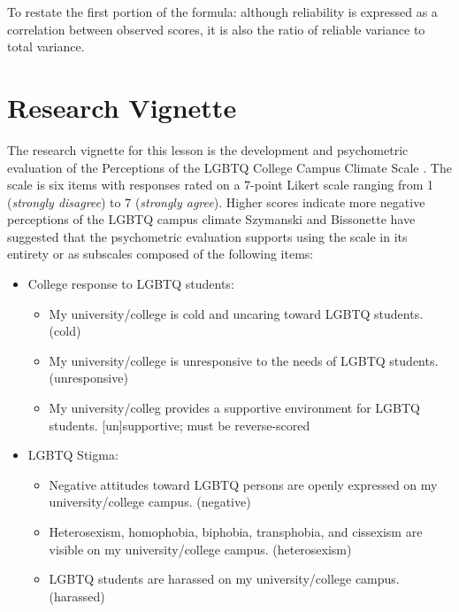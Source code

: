 \documentclass[
  english,
]{book}
\providecommand{\tightlist}{%
  \setlength{\itemsep}{0pt}\setlength{\parskip}{0pt}}
\begin{document}
To restate the first portion of the formula: although reliability is expressed as a correlation between observed scores, it is also the ratio of reliable variance to total variance.

\hypertarget{research-vignette-2}{%
\section{Research Vignette}\label{research-vignette-2}}

The research vignette for this lesson is the development and psychometric evaluation of the Perceptions of the LGBTQ College Campus Climate Scale \citeyearpar{szymanski_perceptions_2020}. The scale is six items with responses rated on a 7-point Likert scale ranging from 1 (\emph{strongly disagree}) to 7 (\emph{strongly agree}). Higher scores indicate more negative perceptions of the LGBTQ campus climate Szymanski and Bissonette have suggested that the psychometric evaluation supports using the scale in its entirety or as subscales composed of the following items:

\begin{itemize}
\tightlist
\item
  College response to LGBTQ students:

  \begin{itemize}
  \tightlist
  \item
    My university/college is cold and uncaring toward LGBTQ students. (cold)
  \item
    My university/college is unresponsive to the needs of LGBTQ students. (unresponsive)
  \item
    My university/colleg provides a supportive environment for LGBTQ students. {[}un{]}supportive; must be reverse-scored
  \end{itemize}
\item
  LGBTQ Stigma:

  \begin{itemize}
  \tightlist
  \item
    Negative attitudes toward LGBTQ persons are openly expressed on my university/college campus. (negative)
  \item
    Heterosexism, homophobia, biphobia, transphobia, and cissexism are visible on my university/college campus. (heterosexism)
  \item
    LGBTQ students are harassed on my university/college campus. (harassed)
  \end{itemize}
\end{itemize}
\end{document}
